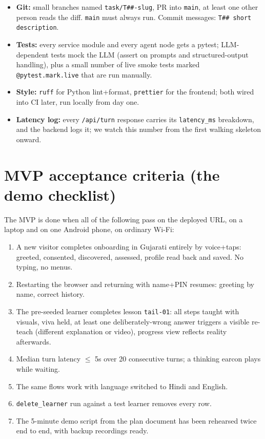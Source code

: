 \documentclass[11pt]{article}
\newcommand{\code}[1]{\texttt{#1}}
\begin{document}
\begin{itemize}
  \item \textbf{Git:} small branches named \code{task/T\#\#-slug}, PR into \code{main}, at least one other person reads the diff. \code{main} must always run. Commit messages: \code{T\#\# short description}.
  \item \textbf{Tests:} every service module and every agent node gets a pytest; LLM-dependent tests mock the LLM (assert on prompts and structured-output handling), plus a small number of live smoke tests marked \code{@pytest.mark.live} that are run manually.
  \item \textbf{Style:} \code{ruff} for Python lint+format, \code{prettier} for the frontend; both wired into CI later, run locally from day one.
  \item \textbf{Latency log:} every \code{/api/turn} response carries its \code{latency\_ms} breakdown, and the backend logs it; we watch this number from the first walking skeleton onward.
\end{itemize}

\section{MVP acceptance criteria (the demo checklist)}
\label{sec:acceptance}

The MVP is done when all of the following pass on the deployed URL, on a laptop and on one Android phone, on ordinary Wi-Fi:

\begin{enumerate}
  \item A new visitor completes onboarding in Gujarati entirely by voice+taps: greeted, consented, discovered, assessed, profile read back and saved. No typing, no menus.
  \item Restarting the browser and returning with name+PIN resumes: greeting by name, correct history.
  \item The pre-seeded learner completes lesson \code{tail-01}: all steps taught with visuals, viva held, at least one deliberately-wrong answer triggers a visible re-teach (different explanation or video), progress view reflects reality afterwards.
  \item Median turn latency \(\leq\) 5s over 20 consecutive turns; a thinking earcon plays while waiting.
  \item The same flows work with language switched to Hindi and English.
  \item \code{delete\_learner} run against a test learner removes every row.
  \item The 5-minute demo script from the plan document has been rehearsed twice end to end, with backup recordings ready.
\end{enumerate}
\end{document}

